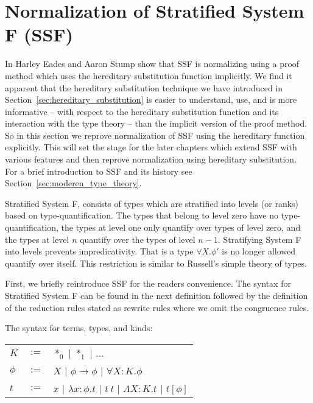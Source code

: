 \section{Normalization of Stratified System F (SSF)}
\label{subsec:normalization_stratified_system_f}
In \cite{Eades:2010} Harley Eades and Aaron Stump show that SSF is
normalizing using a proof method which uses the hereditary
substitution function implicitly.  We find it apparent that the
hereditary substitution technique we have introduced in
Section~\ref{sec:hereditary_substitution} is easier to understand,
use, and is more informative -- with respect to the hereditary
substitution function and its interaction with the type theory -- than
the implicit version of the proof method.  So in this section we
reprove normalization of SSF using the hereditary function explicitly.
This will set the stage for the later chapters which extend SSF with
various features and then reprove normalization using hereditary
substitution.  For a brief introduction to SSF and its history see
Section~\ref{sec:moderen_type_theory}.

Stratified System F, consists of types which are stratified into
levels (or ranks) based on type-quantification.  The types that belong
to level zero have no type-quantification, the types at level one only
quantify over types of level zero, and the types at level $n$ quantify
over the types of level $n-1$.  Stratifying System F into levels
prevents impredicativity.  That is a type $\forall X.\phi'$ is no
longer allowed quantify over itself.  This restriction is similar to
Russell's simple theory of types.

First, we briefly reintroduce SSF for the readers convenience.  The
syntax for Stratified System F can be found in the next definition
followed by the definition of the reduction rules stated as rewrite
rules where we omit the congruence rules.
\begin{definition}
  \label{def:syntax_ssf}
  The syntax for terms, types, and kinds:
  \begin{center}
    \begin{tabular}{lll}
      $K$ & $:=$ & $*_0$ $|$ $*_1$             $|$ $\ldots$\\
      $\phi$ & $:=$ & $X$   $|$ $\phi \rightarrow \phi$ $|$ $\forall X:K.\phi$\\
      $t$ & $:=$ & $x$   $|$ $\lambda x:\phi.t$   $|$ $t\ t$ $|$ $\Lambda X:K.t$ $|$ $t[\phi]$\\
    \end{tabular}
  \end{center}
\end{definition}


